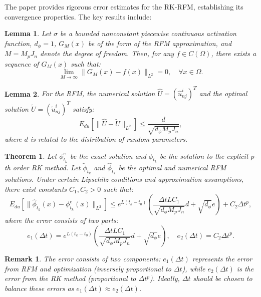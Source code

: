 \documentclass[11pt]{article}
\newtheorem{theorem}{Theorem}
\newtheorem{lemma}{Lemma}
\newtheorem{remark}{Remark}
\begin{document}
The paper provides rigorous error estimates for the RK-RFM, establishing its convergence properties. The key results include:

\begin{lemma}
Let $\sigma$ be a bounded nonconstant piecewise continuous activation function, $d_\phi=1$, $G_M(x)$ be of the form of the RFM approximation, and $M = M_p J_n$ denote the degree of freedom. Then, for any $f \in C(\Omega)$, there exists a sequence of $G_M(x)$ such that:
\begin{equation}
    \lim_{M\to\infty} \|G_M(x) - f(x)\|_{L^2} = 0, \quad \forall x \in \Omega.
\end{equation}
\end{lemma}

\begin{lemma}
For the RFM, the numerical solution $\hat{U} = (\hat{u}^i_{nj})^T$ and the optimal solution $\tilde{U} = (\tilde{u}^i_{nj})^T$ satisfy:
\begin{equation}
    E_{du}[\|\hat{U} - \tilde{U}\|_{L^2}] \leq \frac{d}{\sqrt{d_\phi M_p J_n}},
\end{equation}
where $d$ is related to the distribution of random parameters.
\end{lemma}

\begin{theorem}
Let $\phi^e_{t_k}$ be the exact solution and $\phi_{t_k}$ be the solution to the explicit $p$-th order RK method. Let $\tilde{\phi}_{t_k}$ and $\hat{\phi}_{t_k}$ be the optimal and numerical RFM solutions. Under certain Lipschitz conditions and approximation assumptions, there exist constants $C_1, C_2 > 0$ such that:
\begin{equation}
    E_{du}[\|\hat{\phi}_{t_k}(x) - \phi^e_{t_k}(x)\|_{L^2}] \leq e^{L(t_k-t_0)}\left(\frac{\Delta t L C_1}{\sqrt{d_\phi M_p J_n}}d + \sqrt{d_\phi}e\right) + C_2 \Delta t^p,
\end{equation}
where the error consists of two parts:
\begin{equation}
    e_1(\Delta t) = e^{L(t_k-t_0)}\left(\frac{\Delta t L C_1}{\sqrt{d_\phi M_p J_n}}d + \sqrt{d_\phi}e\right), \quad e_2(\Delta t) = C_2\Delta t^p.
\end{equation}
\end{theorem}

\begin{remark}
The error consists of two components: $e_1(\Delta t)$ represents the error from RFM and optimization (inversely proportional to $\Delta t$), while $e_2(\Delta t)$ is the error from the RK method (proportional to $\Delta t^p$). Ideally, $\Delta t$ should be chosen to balance these errors as $e_1(\Delta t) \approx e_2(\Delta t)$.
\end{remark}
\end{document}
